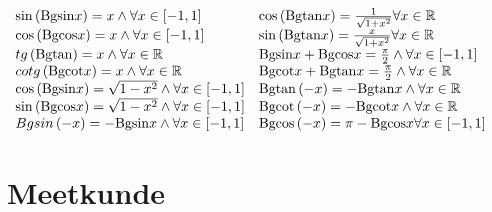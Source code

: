 \documentclass[a5paper]{article}
\begin{document}
$\begin{array}{*{20}{l}}
{\sin \left( {{\mathop{\rm Bgsin}\nolimits} x} \right) = x \wedge \forall x \in \left[ { - 1,1} \right]}&{\cos \left( {{\mathop{\rm Bgtan}\nolimits} x} \right) = \frac{1}{{\sqrt {1 + {x^2}} }}\forall x \in \mathbb {R} }\\
{\cos \left( {{\mathop{\rm Bgcos}\nolimits} x} \right) = x \wedge \forall x \in \left[ { - 1,1} \right]}&{\sin \left( {{\mathop{\rm Bgtan}\nolimits} x} \right) = \frac{x}{{\sqrt {1 + {x^2}} }}\forall x \in \mathbb {R} }\\
{tg\left( {{\mathop{\rm Bgtan}\nolimits} } \right) = x \wedge \forall x \in \mathbb {R} }&{{\mathop{\rm Bgsin}\nolimits} x + {\mathop{\rm Bgcos}\nolimits} x = \frac{\pi }{2} \wedge \forall x \in \left[ { - 1,1} \right]}\\
{cotg\left( {{\mathop{\rm Bgcot}\nolimits} x} \right) = x \wedge \forall x \in \mathbb {R} }&{{\mathop{\rm Bgcot}\nolimits} x + {\mathop{\rm Bgtan}\nolimits} x = \frac{\pi }{2} \wedge \forall x \in \mathbb {R} }\\
{\cos \left( {{\mathop{\rm Bgsin}\nolimits} x} \right) = \sqrt {1 - {x^2}} \wedge \forall x \in \left[ { - 1,1} \right]}&{{\mathop{\rm Bgtan}\nolimits} \left( { - x} \right) =  - {\mathop{\rm Bgtan}\nolimits} x \wedge \forall x \in \mathbb {R} }\\
{\sin \left( {{\mathop{\rm Bgcos}\nolimits} x} \right) = \sqrt {1 - {x^2}}  \wedge\forall x \in \left[ { - 1,1} \right]}&{{\mathop{\rm Bgcot}\nolimits} \left( { - x} \right) =  - {\mathop{\rm Bgcot}\nolimits} x \wedge \forall x \in \mathbb {R} }\\
{Bgsin\left( { - x} \right) =  - {\mathop{\rm Bgsin}\nolimits} x \wedge \forall x \in \left[ { - 1,1} \right]}&{{\mathop{\rm Bgcos}\nolimits} \left( { - x} \right) = \pi  - {\mathop{\rm Bgcos}\nolimits} x\forall x \in \left[ { - 1,1} \right]}
\end{array}$

\newpage

\section{Meetkunde}
\end{document}
